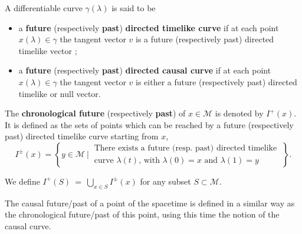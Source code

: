\documentclass[11pt]{book}
\newcommand{\com}[1]{{\color{red}\bf #1}}
\newcommand{\Mcal}{\mathcal{M}}
\newcommand{\Rbb}{\mathbb{R}}
\newcommand{\dsf}{\mathsf{d}}
\theoremstyle{break}
\newtheorem{definition}{Definition}[chapter]
\begin{document}


A differentiable curve $\gamma(\lambda)$ is said to be 
\begin{itemize}
\item a \textbf{future} (respectively \textbf{past}) \textbf{directed timelike curve} if at each point $x(\lambda) \in \gamma$ the tangent vector $v$ is a future (respectively past) directed timelike vector ;
\item a \textbf{future} (respectively \textbf{past}) \textbf{directed causal curve} if at each point $x(\lambda) \in \gamma$ the tangent vector $v$ is either a future (respectively past) directed timelike or null vector. 
\end{itemize}


The \textbf{chronological future} (respectively \textbf{past}) of $x \in \Mcal$ is denoted by $I^{+}(x)$. It is defined as the sets of points which can be reached by a future (respectively past) directed timelike curve starting from $x$,
%
\begin{equation*}
I^{\pm}(x) = \left\{ y \in \Mcal \ \bigg| \ \begin{array}{l} \text{There exists a future (resp. past) directed timelike} \\ \text{curve $\lambda(t)$, with $\lambda(0)=x$ and $\lambda(1)=y$} \end{array} \ \right\}.
\end{equation*}

We define $I^{+}(S) \ = \ \bigcup_{x \in S} I^{\pm}(x)$ for any subset $S \subset \Mcal$.
%


The causal future/past of a point of the spacetime is defined in a similar way as the chronological future/past of this point, using this time the notion of the causal curve.


%
%
%
%
\end{document}
